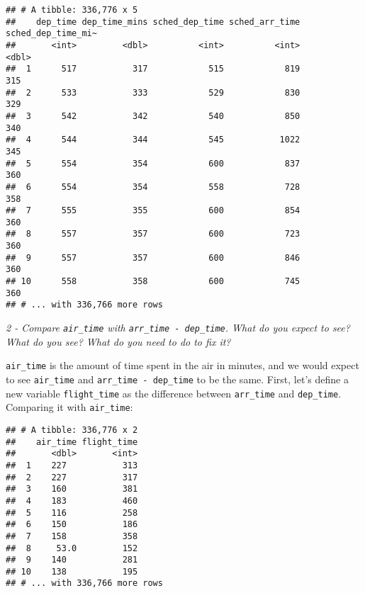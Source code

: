 \documentclass[]{article}
\newenvironment{Shaded}{\begin{snugshade}}{\end{snugshade}}
\newcommand{\KeywordTok}[1]{\textcolor[rgb]{0.13,0.29,0.53}{\textbf{#1}}}
\newcommand{\DataTypeTok}[1]{\textcolor[rgb]{0.13,0.29,0.53}{#1}}
\newcommand{\StringTok}[1]{\textcolor[rgb]{0.31,0.60,0.02}{#1}}
\newcommand{\OperatorTok}[1]{\textcolor[rgb]{0.81,0.36,0.00}{\textbf{#1}}}
\newcommand{\NormalTok}[1]{#1}
\theoremstyle{definition}
\theoremstyle{definition}
\theoremstyle{definition}
\theoremstyle{remark}
\begin{document}
\begin{verbatim}
## # A tibble: 336,776 x 5
##    dep_time dep_time_mins sched_dep_time sched_arr_time sched_dep_time_mi~
##       <int>         <dbl>          <int>          <int>              <dbl>
##  1      517           317            515            819                315
##  2      533           333            529            830                329
##  3      542           342            540            850                340
##  4      544           344            545           1022                345
##  5      554           354            600            837                360
##  6      554           354            558            728                358
##  7      555           355            600            854                360
##  8      557           357            600            723                360
##  9      557           357            600            846                360
## 10      558           358            600            745                360
## # ... with 336,766 more rows
\end{verbatim}

\emph{2 - Compare \texttt{air\_time} with
\texttt{arr\_time\ -\ dep\_time}. What do you expect to see? What do you
see? What do you need to do to fix it?}

\texttt{air\_time} is the amount of time spent in the air in minutes,
and we would expect to see \texttt{air\_time} and
\texttt{arr\_time\ -\ dep\_time} to be the same. First, let's define a
new variable \texttt{flight\_time} as the difference between
\texttt{arr\_time} and \texttt{dep\_time}. Comparing it with
\texttt{air\_time}:

\begin{Shaded}
\end{Shaded}

\begin{verbatim}
## # A tibble: 336,776 x 2
##    air_time flight_time
##       <dbl>       <int>
##  1    227           313
##  2    227           317
##  3    160           381
##  4    183           460
##  5    116           258
##  6    150           186
##  7    158           358
##  8     53.0         152
##  9    140           281
## 10    138           195
## # ... with 336,766 more rows
\end{verbatim}
\end{document}
